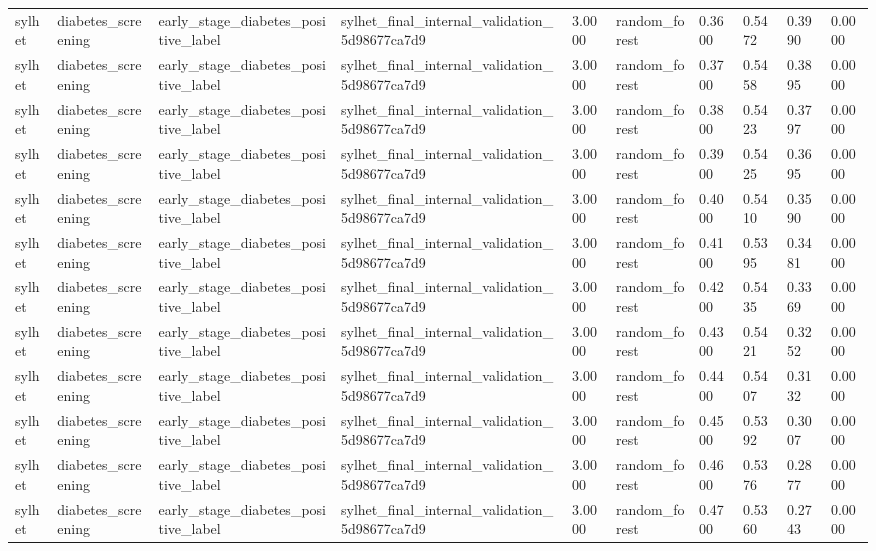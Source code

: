 \begin{tabular}{llllllllll}
sylhet & diabetes\_screening & early\_stage\_diabetes\_positive\_label & sylhet\_final\_internal\_validation\_5d98677ca7d9 & 3.0000 & random\_forest & 0.3600 & 0.5472 & 0.3990 & 0.0000 \\
sylhet & diabetes\_screening & early\_stage\_diabetes\_positive\_label & sylhet\_final\_internal\_validation\_5d98677ca7d9 & 3.0000 & random\_forest & 0.3700 & 0.5458 & 0.3895 & 0.0000 \\
sylhet & diabetes\_screening & early\_stage\_diabetes\_positive\_label & sylhet\_final\_internal\_validation\_5d98677ca7d9 & 3.0000 & random\_forest & 0.3800 & 0.5423 & 0.3797 & 0.0000 \\
sylhet & diabetes\_screening & early\_stage\_diabetes\_positive\_label & sylhet\_final\_internal\_validation\_5d98677ca7d9 & 3.0000 & random\_forest & 0.3900 & 0.5425 & 0.3695 & 0.0000 \\
sylhet & diabetes\_screening & early\_stage\_diabetes\_positive\_label & sylhet\_final\_internal\_validation\_5d98677ca7d9 & 3.0000 & random\_forest & 0.4000 & 0.5410 & 0.3590 & 0.0000 \\
sylhet & diabetes\_screening & early\_stage\_diabetes\_positive\_label & sylhet\_final\_internal\_validation\_5d98677ca7d9 & 3.0000 & random\_forest & 0.4100 & 0.5395 & 0.3481 & 0.0000 \\
sylhet & diabetes\_screening & early\_stage\_diabetes\_positive\_label & sylhet\_final\_internal\_validation\_5d98677ca7d9 & 3.0000 & random\_forest & 0.4200 & 0.5435 & 0.3369 & 0.0000 \\
sylhet & diabetes\_screening & early\_stage\_diabetes\_positive\_label & sylhet\_final\_internal\_validation\_5d98677ca7d9 & 3.0000 & random\_forest & 0.4300 & 0.5421 & 0.3252 & 0.0000 \\
sylhet & diabetes\_screening & early\_stage\_diabetes\_positive\_label & sylhet\_final\_internal\_validation\_5d98677ca7d9 & 3.0000 & random\_forest & 0.4400 & 0.5407 & 0.3132 & 0.0000 \\
sylhet & diabetes\_screening & early\_stage\_diabetes\_positive\_label & sylhet\_final\_internal\_validation\_5d98677ca7d9 & 3.0000 & random\_forest & 0.4500 & 0.5392 & 0.3007 & 0.0000 \\
sylhet & diabetes\_screening & early\_stage\_diabetes\_positive\_label & sylhet\_final\_internal\_validation\_5d98677ca7d9 & 3.0000 & random\_forest & 0.4600 & 0.5376 & 0.2877 & 0.0000 \\
sylhet & diabetes\_screening & early\_stage\_diabetes\_positive\_label & sylhet\_final\_internal\_validation\_5d98677ca7d9 & 3.0000 & random\_forest & 0.4700 & 0.5360 & 0.2743 & 0.0000 \\

\end{tabular}
